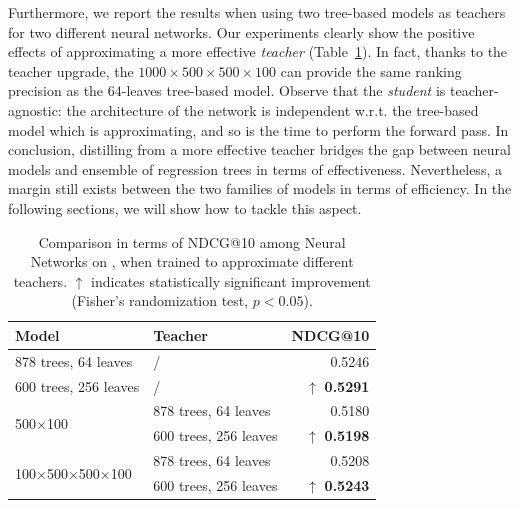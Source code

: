 Furthermore, we report the results when using two tree-based models as teachers for two different neural networks. 
Our experiments clearly show the positive effects of approximating a more effective \textit{teacher} (Table~\ref{table:imprteacher}). In fact, thanks to the teacher upgrade, the  $1000\times500\times500\times100$ can provide the same ranking precision as the $64$-leaves tree-based model. Observe that the \textit{student} is teacher-agnostic: the architecture of the network is independent w.r.t. the tree-based model which is approximating, and so is the time to perform the forward pass. In conclusion, distilling from a more effective teacher bridges the gap between neural models and ensemble of regression trees in terms of effectiveness. Nevertheless, a margin still exists between the two families of models in terms of efficiency. In the following sections, we will show how to tackle this aspect. 


\begin{table}
\centering
	\begin{tabular}{llr}
		\toprule
		Model  & Teacher & NDCG@10 \\
		\midrule	
		878 trees, 64 leaves &  / &  0.5246  \\
		600 trees, 256 leaves &  / &  $\uparrow$ \textbf{0.5291}     \\
		\midrule
		\multirow{2}{*}{500$\times$100} & 878 trees, 64 leaves & 0.5180 \\
		& 600 trees, 256 leaves &$\uparrow$ \textbf{0.5198} \\  
		\midrule
		\multirow{2}{*}{100$\times$500$\times$500$\times$100} & 878 trees, 64 leaves & 0.5208 \\
		& 600 trees, 256 leaves &$\uparrow$ \textbf{0.5243}  \\
		\bottomrule
	\end{tabular}
	\caption{Comparison in terms of NDCG@10 among Neural Networks on \msn, when trained to approximate different teachers.  $\uparrow$ indicates statistically significant improvement (Fisher's randomization test,  $p < 0.05$).  }
	\label{table:imprteacher}
\end{table}


